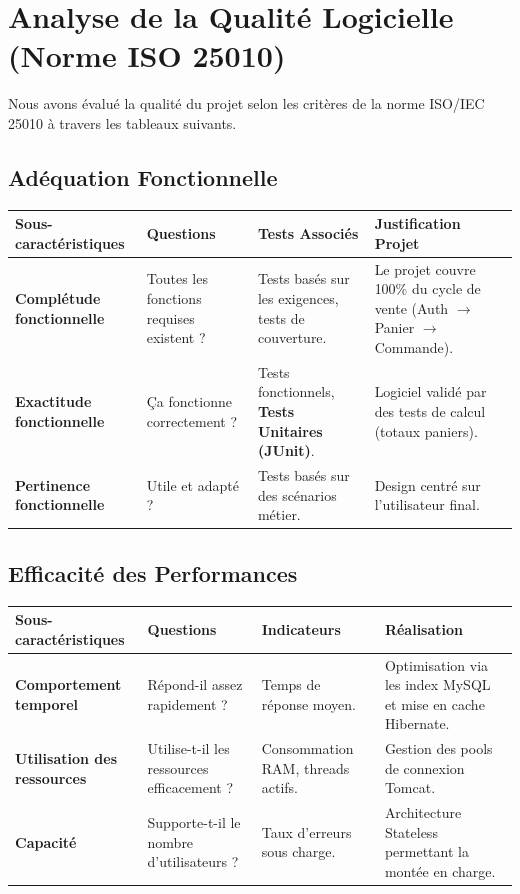 \documentclass[12pt,a4paper]{report}
\begin{document}
\chapter{Analyse de la Qualité Logicielle (Norme ISO 25010)}

Nous avons évalué la qualité du projet selon les critères de la norme ISO/IEC 25010 à travers les tableaux suivants.

\section{Adéquation Fonctionnelle}
\begin{table}[ht!]
\centering\small
\begin{tabular}{|p{3cm}|p{3cm}|p{4cm}|p{4cm}|}
\hline
\rowcolor{headerblue}\color{white}Sous-caractéristiques & \color{white}Questions & \color{white}Tests Associés & \color{white}Justification Projet \\ \hline
\textbf{Complétude fonctionnelle} & Toutes les fonctions requises existent ? & Tests basés sur les exigences, tests de couverture. & Le projet couvre 100\% du cycle de vente (Auth $\rightarrow$ Panier $\rightarrow$ Commande). \\ \hline
\textbf{Exactitude fonctionnelle} & Ça fonctionne correctement ? & Tests fonctionnels, \textbf{Tests Unitaires (JUnit)}. & Logiciel validé par des tests de calcul (totaux paniers). \\ \hline
\textbf{Pertinence fonctionnelle} & Utile et adapté ? & Tests basés sur des scénarios métier. & Design centré sur l'utilisateur final. \\ \hline
\end{tabular}
\end{table}

\section{Efficacité des Performances}
\begin{table}[ht!]
\centering\small
\begin{tabular}{|p{3.5cm}|p{3cm}|p{3.5cm}|p{4cm}|}
\hline
\rowcolor{headerblue}\color{white}Sous-caractéristiques & \color{white}Questions & \color{white}Indicateurs & \color{white}Réalisation \\ \hline
\textbf{Comportement temporel} & Répond-il assez rapidement ? & Temps de réponse moyen. & Optimisation via les index MySQL et mise en cache Hibernate. \\ \hline
\textbf{Utilisation des ressources} & Utilise-t-il les ressources efficacement ? & Consommation RAM, threads actifs. & Gestion des pools de connexion Tomcat. \\ \hline
\textbf{Capacité} & Supporte-t-il le nombre d'utilisateurs ? & Taux d'erreurs sous charge. & Architecture Stateless permettant la montée en charge. \\ \hline
\end{tabular}
\end{table}
\end{document}

